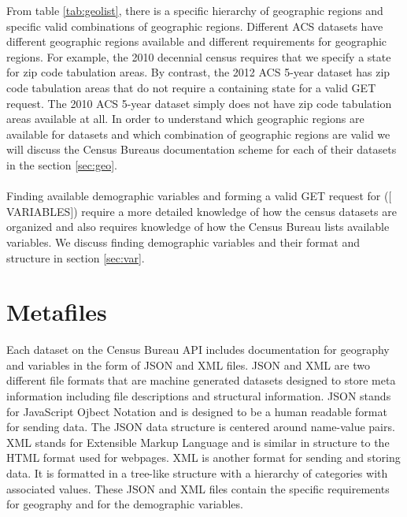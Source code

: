 \documentclass{article}\usepackage[]{graphicx}\usepackage[]{color}
\begin{document}
From table \ref{tab:geolist}, there is a specific hierarchy of geographic regions and specific valid combinations of geographic regions.  Different ACS datasets  have different geographic regions available and different requirements for geographic regions.  For example, the 2010 decennial census requires that we specify a state for zip code tabulation areas.  By contrast, the 2012 ACS 5-year dataset has zip code tabulation areas that do not require a containing state for a valid GET request.  The 2010 ACS 5-year dataset simply does not have zip code tabulation areas available at all.  In order to understand which geographic regions are available for datasets and which combination of geographic regions are valid we will discuss the Census Bureaus documentation scheme for each of their datasets in the section \ref{sec:geo}.\\
\\
Finding available demographic variables and forming a valid GET request for ($[$VARIABLES$]$) require a more detailed knowledge of how the census datasets are organized and also requires knowledge of how the Census Bureau lists available variables.  We discuss finding demographic variables and their format and structure in section \ref{sec:var}.

\section{Metafiles}
Each dataset on the Census Bureau API includes documentation for geography and variables in the form of JSON and XML files.  JSON and XML are two different file formats that are machine generated datasets designed to store meta information including file descriptions and structural information.  JSON stands for JavaScript Ojbect Notation and is designed to be a human readable format for sending data.  The JSON data structure is centered around name-value pairs.  XML stands for Extensible Markup Language and is similar in structure to the HTML format used for webpages.  XML is another format for sending and storing data.  It is formatted in a tree-like structure with a hierarchy of categories with associated values.  These JSON and XML files contain the specific requirements for geography and for the demographic variables.
\end{document}
